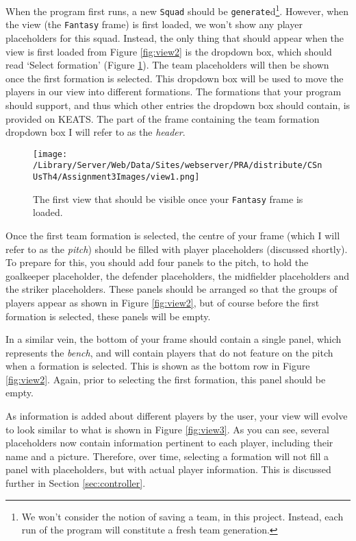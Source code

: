 \documentclass[11pt]{article}
\begin{document}
When the program first runs, a new \texttt{Squad} should be \texttt{generate}d\footnote{We won't consider the notion of saving a team, in this project. Instead, each run of the program will constitute a fresh team generation.}. However, when the view (the \texttt{Fantasy} frame) is first loaded, we won't show any player placeholders for this squad. Instead, the only thing that should appear when the view is first loaded from Figure \ref{fig:view2} is the dropdown box, which should read `Select formation' (Figure \ref{fig:view1}). The team placeholders will then be shown once the first formation is selected. This dropdown box will be used to move the players in our view into different formations. The formations that your program should support, and thus which other entries the dropdown box should contain, is provided on KEATS. The part of the frame containing the team formation dropdown box I will refer to as the \emph{header}.

\begin{figure}[htbp]
\begin{center}
\texttt{[image: /Library/Server/Web/Data/Sites/webserver/PRA/distribute/CSnUsTh4/Assignment3Images/view1.png]}
\caption{The first view that should be visible once your \texttt{Fantasy} frame is loaded.}
\label{fig:view1}
\end{center}
\end{figure}

Once the first team formation is selected, the centre of your frame (which I will refer to as the \emph{pitch}) should be filled with player placeholders (discussed shortly). To prepare for this, you should add four panels to the pitch, to hold the goalkeeper placeholder, the defender placeholders, the midfielder placeholders and the striker placeholders. These panels should be arranged so that the groups of players appear as shown in Figure \ref{fig:view2}, but of course before the first formation is selected, these panels will be empty. 

In a similar vein, the bottom of your frame should contain a single panel, which represents the \emph{bench}, and will contain players that do not feature on the pitch when a formation is selected. This is shown as the bottom row in Figure \ref{fig:view2}. Again, prior to selecting the first formation, this panel should be empty. 

As information is added about different players by the user, your view will evolve to look similar to what is shown in Figure \ref{fig:view3}. As you can see, several placeholders now contain information pertinent to each player, including their name and a picture. Therefore, over time, selecting a formation will not fill a panel with placeholders, but with actual player information. This is discussed further in Section \ref{sec:controller}.
\end{document}
